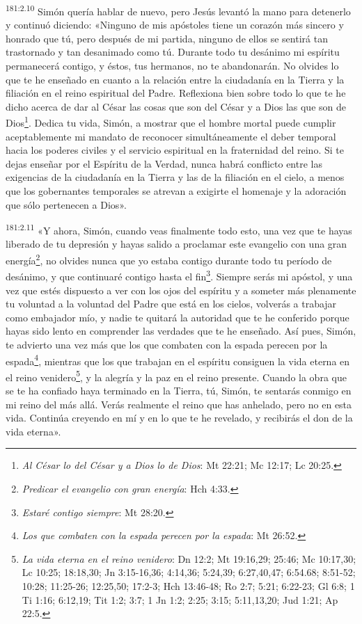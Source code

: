 \par
\textsuperscript{181:2.10} Simón quería hablar de nuevo, pero Jesús levantó la mano para detenerlo y continuó diciendo: «Ninguno de mis apóstoles tiene un corazón más sincero y honrado que tú, pero después de mi partida, ninguno de ellos se sentirá tan trastornado y tan desanimado como tú. Durante todo tu desánimo mi espíritu permanecerá contigo, y éstos, tus hermanos, no te abandonarán. No olvides lo que te he enseñado en cuanto a la relación entre la ciudadanía en la Tierra y la filiación en el reino espiritual del Padre. Reflexiona bien sobre todo lo que te he dicho acerca de dar al César las cosas que son del César y a Dios las que son de Dios\footnote{\textit{Al César lo del César y a Dios lo de Dios}: Mt 22:21; Mc 12:17; Lc 20:25.}. Dedica tu vida, Simón, a mostrar que el hombre mortal puede cumplir aceptablemente mi mandato de reconocer simultáneamente el deber temporal hacia los poderes civiles y el servicio espiritual en la fraternidad del reino. Si te dejas enseñar por el Espíritu de la Verdad, nunca habrá conflicto entre las exigencias de la ciudadanía en la Tierra y las de la filiación en el cielo, a menos que los gobernantes temporales se atrevan a exigirte el homenaje y la adoración que sólo pertenecen a Dios».

\par
\textsuperscript{181:2.11} «Y ahora, Simón, cuando veas finalmente todo esto, una vez que te hayas liberado de tu depresión y hayas salido a proclamar este evangelio con una gran energía\footnote{\textit{Predicar el evangelio con gran energía}: Hch 4:33.}, no olvides nunca que yo estaba contigo durante todo tu período de desánimo, y que continuaré contigo hasta el fin\footnote{\textit{Estaré contigo siempre}: Mt 28:20.}. Siempre serás mi apóstol, y una vez que estés dispuesto a ver con los ojos del espíritu y a someter más plenamente tu voluntad a la voluntad del Padre que está en los cielos, volverás a trabajar como embajador mío, y nadie te quitará la autoridad que te he conferido porque hayas sido lento en comprender las verdades que te he enseñado. Así pues, Simón, te advierto una vez más que los que combaten con la espada perecen por la espada\footnote{\textit{Los que combaten con la espada perecen por la espada}: Mt 26:52.}, mientras que los que trabajan en el espíritu consiguen la vida eterna en el reino venidero\footnote{\textit{La vida eterna en el reino venidero}: Dn 12:2; Mt 19:16,29; 25:46; Mc 10:17,30; Lc 10:25; 18:18,30; Jn 3:15-16,36; 4:14,36; 5:24,39; 6:27,40,47; 6:54.68; 8:51-52; 10:28; 11:25-26; 12:25,50; 17:2-3; Hch 13:46-48; Ro 2:7; 5:21; 6:22-23; Gl 6:8; 1 Ti 1:16; 6:12,19; Tit 1:2; 3:7; 1 Jn 1:2; 2:25; 3:15; 5:11,13,20; Jud 1:21; Ap 22:5.}, y la alegría y la paz en el reino presente. Cuando la obra que se te ha confiado haya terminado en la Tierra, tú, Simón, te sentarás conmigo en mi reino del más allá. Verás realmente el reino que has anhelado, pero no en esta vida. Continúa creyendo en mí y en lo que te he revelado, y recibirás el don de la vida eterna».

